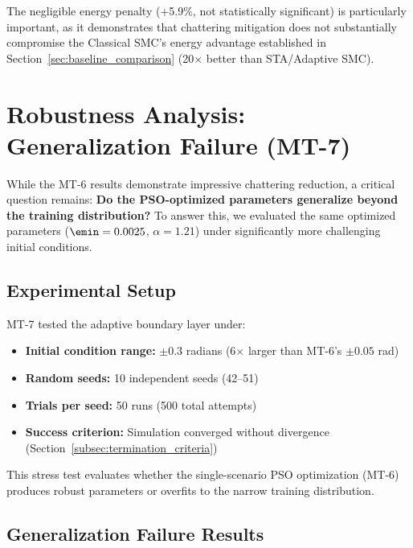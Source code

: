 The negligible energy penalty (+5.9\%, not statistically significant) is particularly important, as it demonstrates that chattering mitigation does not substantially compromise the Classical SMC's energy advantage established in Section~\ref{sec:baseline_comparison} (20$\times$ better than STA/Adaptive SMC).

\section{Robustness Analysis: Generalization Failure (MT-7)}
\label{sec:mt7_robustness}

While the MT-6 results demonstrate impressive chattering reduction, a critical question remains: \textbf{Do the PSO-optimized parameters generalize beyond the training distribution?} To answer this, we evaluated the same optimized parameters ($\emin = 0.0025$, $\alpha = 1.21$) under significantly more challenging initial conditions.

\subsection{Experimental Setup}
\label{subsec:mt7_setup}

MT-7 tested the adaptive boundary layer under:
\begin{itemize}
    \item \textbf{Initial condition range:} $\pm 0.3$ radians (6$\times$ larger than MT-6's $\pm 0.05$ rad)
    \item \textbf{Random seeds:} 10 independent seeds (42--51)
    \item \textbf{Trials per seed:} 50 runs (500 total attempts)
    \item \textbf{Success criterion:} Simulation converged without divergence (Section~\ref{subsec:termination_criteria})
\end{itemize}

This stress test evaluates whether the single-scenario PSO optimization (MT-6) produces robust parameters or overfits to the narrow training distribution.

\subsection{Generalization Failure Results}
\label{subsec:mt7_results}

